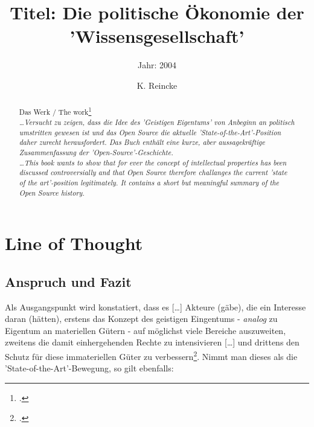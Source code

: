 \documentclass[DIV=calc,BCOR=5mm,11pt,headings=small,oneside,abstract=true, toc=bib]{scrartcl}
\begin{document}

\titlehead{Literaturexzerpt}
\subject{Autor(en): Julian Eckl}
\title{Titel: Die politische Ökonomie der 'Wissensgesellschaft'}
\subtitle{Jahr: 2004 }
\author{K. Reincke}

\maketitle

\begin{abstract}
\noindent
Das Werk / The work\footcite[][]{Eckl2004a} \\
\noindent \itshape
\ldots Versucht zu zeigen, dass die Idee des 'Geistigen Eigentums' von Anbeginn
an politisch umstritten gewesen ist und das Open Source die aktuelle
'State-of-the-Art'-Position daher zurecht herausfordert. Das Buch enthält eine
kurze, aber aussagekräftige Zusammenfassung der 'Open-Source'-Geschichte. \\
\noindent
\ldots This book wants to show that for ever the concept of intellectual
properties has been discussed controversially and that Open Source therefore
challanges the current 'state of the art'-position legitimately. It contains a
short but meaningful summary of the Open Source history.
\end{abstract}
\footnotesize
\normalsize

\section{Line of Thought}

\subsection{Anspruch und Fazit}

Als Ausgangspunkt wird konstatiert, dass es \glqq{}[\ldots] Akteure (gäbe), die
ein Interesse daran (hätten), erstens das Konzept des geistigen Eingentums -
\emph{analog} zu Eigentum an materiellen Gütern - auf möglichst viele Bereiche
auszuweiten, zweitens die damit einhergehenden Rechte zu intensivieren
[\ldots] und drittens den Schutz für diese immateriellen Güter zu
verbessern\grqq{}\footcite[vgl.][9]{Eckl2004a}. Nimmt man dieses als die
'State-of-the-Art'-Bewegung, so gilt ebenfalls:
\end{document}
